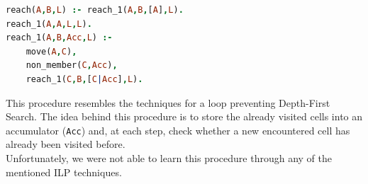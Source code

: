 \begin{lstlisting}[label={lst:r_tr}, language=Prolog, caption=\texttt{reach/3} with tail recursion, belowcaptionskip=1cm]
reach(A,B,L) :- reach_1(A,B,[A],L).
reach_1(A,A,L,L).
reach_1(A,B,Acc,L) :-
    move(A,C),
    non_member(C,Acc),
    reach_1(C,B,[C|Acc],L). 
\end{lstlisting}
This procedure resembles the techniques for a loop preventing Depth-First Search. The idea behind this procedure is to store
the already visited cells into an accumulator (\texttt{Acc}) and, at each step, check whether a new encountered cell has already
been visited before.\\
Unfortunately, we were not able to learn this procedure through any of the mentioned ILP techniques.
\newpage